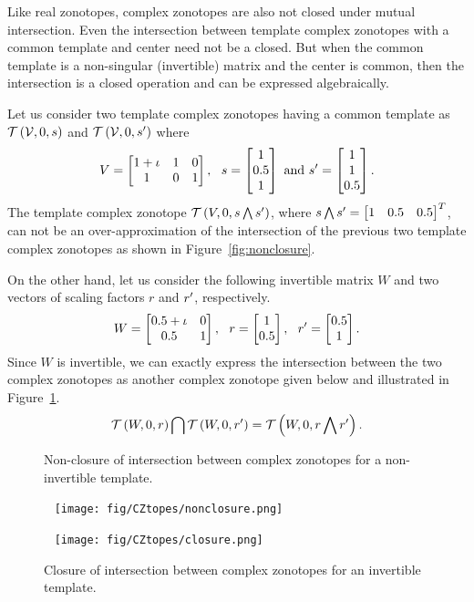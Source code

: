 %
Like real zonotopes, complex zonotopes are also not closed under
mutual intersection.  Even the intersection between template complex
zonotopes with a common template and center need not be a closed.  But
when the common template is a non-singular (invertible) matrix and
the center is common, then the intersection is a closed operation and
can be expressed algebraically.
%
\begin{example}
Let us consider two template complex zonotopes having a common
template as $\mathit{\operatorname{\mathcal{T}}}\left(\mathcal{V},0,s\right)$ and
$\mathit{\operatorname{\mathcal{T}}}\left(\mathcal{V},0,s^\prime\right)$ where
%
\[
V = \left[\begin{matrix}
  1+\iota & 1 & 0\\
  1 & 0 & 1
\end{matrix}\right],~~
s=\left[\begin{matrix}1\\0.5\\1\end{matrix}\right]~\text{and}~s^\prime=\left[\begin{matrix}1\\1\\0.5\end{matrix}\right].
\]
%
The template complex zonotope
$\mathit{\operatorname{\mathcal{T}}}\left(V,0,s\bigwedge s^\prime\right)$, where
$s\bigwedge s^\prime=\left[\begin{matrix}1 & 0.5 & 0.5\end{matrix}\right]^T$, can not be an
over-approximation of the intersection of the previous two template
complex zonotopes as shown in Figure~\ref{fig:nonclosure}.

On the other hand, let us consider the following invertible matrix $W$
and two vectors of scaling factors $r$ and $r^\prime$, respectively.
%
\[
W=\left[\begin{matrix}0.5+\iota & 0\\ 0.5 & 1\end{matrix}\right],~~r=\left[\begin{matrix}1\\0.5\end{matrix}\right],~~r^\prime=\left[\begin{matrix}0.5\\1\end{matrix}\right].
\]
%
Since $W$ is invertible, we can exactly express the intersection
between the two complex zonotopes as another complex zonotope given
below and illustrated in Figure~\ref{fig:closure}.
%
\[
\mathit{\operatorname{\mathcal{T}}}\left(W,0,r\right)\bigcap\mathit{\operatorname{\mathcal{T}}}\left(W,0,r^\prime\right) = \mathit{\operatorname{\mathcal{T}}}\left(W,0,r\bigwedge r^\prime\right).
\]
%
\end{example}
%
\begin{figure}
  \center
  \caption{Non-closure of intersection between complex zonotopes for a non-invertible template.}~\label{fig:nonclosure}
  \texttt{[image: fig/CZtopes/nonclosure.png]}
  \vspace{1em}
  \caption{Closure of intersection between complex zonotopes for an invertible template.}~\label{fig:closure}
  \texttt{[image: fig/CZtopes/closure.png]}
\end{figure}
%

